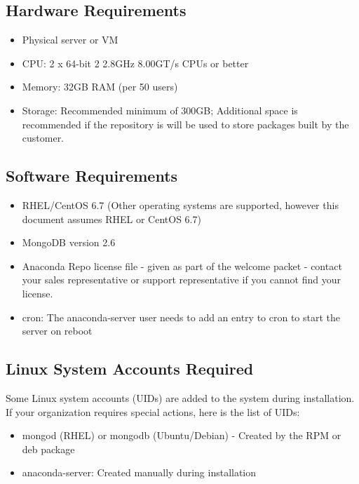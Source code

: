 \documentclass[letterpaper,10pt,openany,oneside]{sphinxmanual}
\begin{document}
\subsection{Hardware Requirements}
\label{AnacondaRepository:hardware-requirements}\begin{itemize}
\item {} 
Physical server or VM

\item {} 
CPU: 2 x 64-bit 2 2.8GHz 8.00GT/s CPUs or better

\item {} 
Memory: 32GB RAM (per 50 users)

\item {} 
Storage: Recommended minimum of 300GB; Additional space is
recommended if the repository is will be used to store packages built
by the customer.

\end{itemize}


\subsection{Software Requirements}
\label{AnacondaRepository:software-requirements}\begin{itemize}
\item {} 
RHEL/CentOS 6.7 (Other operating systems are supported, however this
document assumes RHEL or CentOS 6.7)

\item {} 
MongoDB version 2.6

\item {} 
Anaconda Repo license file - given as part of the welcome packet -
contact your sales representative or support representative if you
cannot find your license.

\item {} 
cron: The anaconda-server user needs to add an entry to cron to start the server on reboot

\end{itemize}


\subsection{Linux System Accounts Required}
\label{AnacondaRepository:linux-system-accounts-required}
Some Linux system accounts (UIDs) are added to the system during installation.
If your organization requires special actions, here is the list of UIDs:
\begin{itemize}
\item {} 
mongod (RHEL) or mongodb (Ubuntu/Debian) - Created by the RPM or deb package

\item {} 
anaconda-server: Created manually during installation

\end{itemize}
\end{document}
